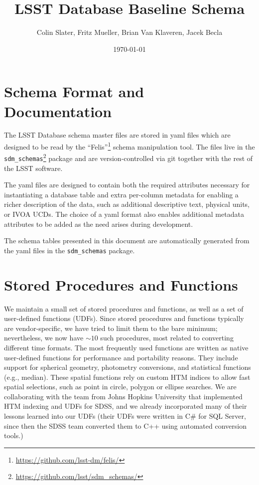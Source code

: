 \documentclass[DM,lsstdraft,toc]{lsstdoc}
\title{LSST Database Baseline Schema}
\author{%
Colin Slater,
Fritz Mueller,
Brian Van Klaveren,
Jacek Becla
}
\date{\today}
\begin{document}
\maketitle

\section{Schema Format and Documentation}

The LSST Database schema master files are stored in yaml files which are designed to be read by the ``Felis''\footnote{\url{https://github.com/lsst-dm/felis/}} schema manipulation tool. The files live in the \texttt{sdm\_schemas}\footnote{\url{https://github.com/lsst/sdm\_schemas/}} package and are version-controlled via git together with the rest of the LSST software.

The yaml files are designed to contain both the required attributes necessary for instantiating a database table and extra per-column metadata for enabling a richer description of the data, such as additional descriptive text, physical units, or IVOA UCDs. The choice of a yaml format also enables additional metadata attributes to be added as the need arises during development.

The schema tables presented in this document are automatically generated from the yaml files in the \texttt{sdm\_schemas} package.

\section{Stored Procedures and Functions}

We maintain a small set of stored procedures and functions, as well as a set of user-defined functions (UDFs). Since stored procedures and functions typically are vendor-specific, we have tried to limit them to the bare minimum; nevertheless, we now have $\sim10$ such procedures, most related to converting different time formats. The most frequently used functions are written as native user-defined functions for performance and portability reasons. They include support for spherical geometry, photometry conversions, and statistical functions (e.g., median). These spatial functions rely on custom HTM indices to allow fast spatial selections, such as point in circle, polygon or ellipse searches. We are collaborating with the team from Johns Hopkins University that implemented HTM indexing and UDFs for SDSS, and we already incorporated many of their lessons learned into our UDFs (their UDFs were written in C\# for SQL Server, since then the SDSS team converted them to C++ using automated conversion tools.)
\end{document}
